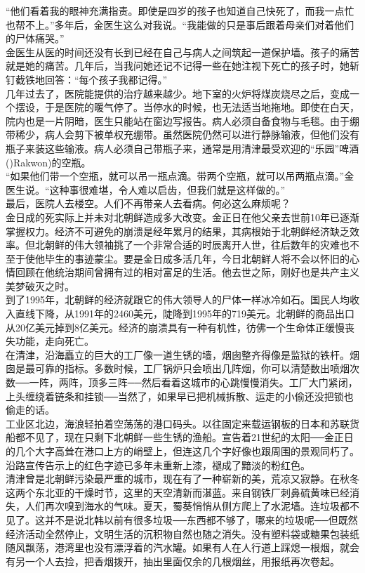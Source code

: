 “他们看着我的眼神充满指责。即使是四岁的孩子也知道自己快死了，而我一点忙也帮不上。”多年后，金医生这么对我说。“我能做的只是事后跟着母亲们对着他们的尸体痛哭。”\\

金医生从医的时间还没有长到已经在自己与病人之间筑起一道保护墙。孩子的痛苦就是她的痛苦。几年后，当我问她还记不记得一些在她注视下死亡的孩子时，她斩钉截铁地回答：“每个孩子我都记得。”\\

几年过去了，医院能提供的治疗越来越少。地下室的火炉将煤炭烧尽之后，变成一个摆设，于是医院的暖气停了。当停水的时候，也无法适当地拖地。即使在白天，院内也是一片阴暗，医生只能站在窗边写报告。病人必须自备食物与毛毯。由于绷带稀少，病人会剪下被单权充绷带。虽然医院仍然可以进行静脉输液，但他们没有瓶子来装这些输液。病人必须自己带瓶子来，通常是用清津最受欢迎的“乐园”啤酒()Rakwon)的空瓶。\\

“如果他们带一个空瓶，就可以吊一瓶点滴。带两个空瓶，就可以吊两瓶点滴。”金医生说。“这种事很难堪，令人难以启齿，但我们就是这样做的。”\\

最后，医院人去楼空。人们不再带亲人去看病。何必这么麻烦呢？\\

金日成的死实际上并未对北朝鲜造成多大改变。金正日在他父亲去世前10年已逐渐掌握权力。经济不可避免的崩溃是经年累月的结果，其病根始于北朝鲜经济缺乏效率。但北朝鲜的伟大领袖挑了一个非常合适的时辰离开人世，往后数年的灾难也不至于使他毕生的事迹蒙尘。要是金日成多活几年，今日北朝鲜人将不会以怀旧的心情回顾在他统治期间曾拥有过的相对富足的生活。他去世之际，刚好也是共产主义美梦破灭之时。\\

到了1995年，北朝鲜的经济就跟它的伟大领导人的尸体一样冰冷如石。国民人均收入直线下降，从1991年的2460美元，陡降到1995年的719美元。北朝鲜的商品出口从20亿美元掉到8亿美元。经济的崩溃具有一种有机性，彷佛一个生命体正缓慢丧失功能，走向死亡。\\

在清津，沿海矗立的巨大的工厂像一道生锈的墙，烟囱整齐得像是监狱的铁杆。烟囱是最可靠的指标。多数时候，工厂锅炉只会喷出几阵烟，你可以清楚数出喷烟次数──一阵，两阵，顶多三阵──然后看着这城市的心跳慢慢消失。工厂大门紧闭，上头缠绕着链条和挂锁──当然了，如果早已把机械拆散、运走的小偷还没把锁也偷走的话。\\

工业区北边，海浪轻拍着空荡荡的港口码头。以往固定来载运钢板的日本和苏联货船都不见了，现在只剩下北朝鲜一些生锈的渔船。宣告着21世纪的太阳──金正日的几个大字高耸在港口上方的峭壁上，但连这几个字好像也跟周围的景观同朽了。沿路宣传告示上的红色字迹已多年未重新上漆，褪成了黯淡的粉红色。\\

清津曾是北朝鲜污染最严重的城市，现在有了一种崭新的美，荒凉又寂静。在秋冬这两个东北亚的干燥时节，这里的天空清新而湛蓝。来自钢铁厂刺鼻硫黄味已经消失，人们再次嗅到海水的气味。夏天，蜀葵悄悄从侧方爬上了水泥墙。连垃圾都不见了。这并不是说北韩以前有很多垃圾──东西都不够了，哪来的垃圾呢──但既然经济活动全然停止，文明生活的沉积物自然也随之消失。没有塑料袋或糖果包装纸随风飘荡，港湾里也没有漂浮着的汽水罐。如果有人在人行道上踩熄一根烟，就会有另一个人去捡，把香烟拨开，抽出里面仅余的几根烟丝，用报纸再次卷起。\\